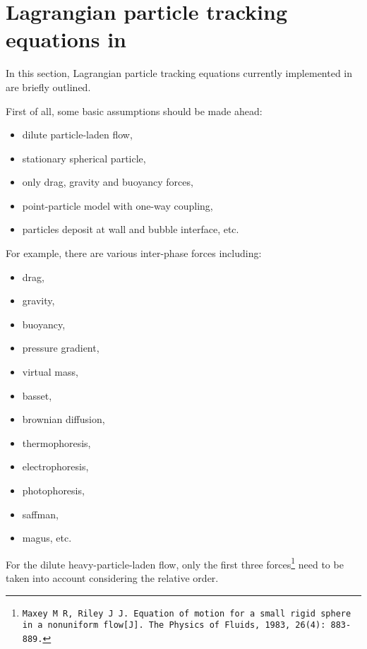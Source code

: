 \section{Lagrangian particle tracking equations in {\psiboil}}

\label{sec_lptequations}

In this section, Lagrangian particle tracking equations currently implemented in {\psiboil} are briefly outlined.

First of all, some basic assumptions should be made ahead:

\begin{itemize}
  \item {dilute particle-laden flow}, 
  \item {stationary spherical particle}, 
  \item {only drag, gravity and buoyancy forces}, 
  \item {point-particle model with one-way coupling},
  \item {particles deposit at wall and bubble interface, etc}.
\end{itemize}

For example, there are various inter-phase forces including:

\begin{itemize}
  \item {drag}, 
  \item {gravity}, 
  \item {buoyancy}, 
  \item {pressure gradient},
  \item {virtual mass},
  \item {basset},
  \item {brownian diffusion},
  \item {thermophoresis},
  \item {electrophoresis},
  \item {photophoresis},
  \item {saffman},
  \item {magus, etc}.
\end{itemize}

For the dilute heavy-particle-laden flow, only the first three forces\footnote{\tt Maxey M R, Riley J J. Equation of motion for a small rigid sphere in a nonuniform flow[J]. The Physics of Fluids, 1983, 26(4): 883-889.} need to be taken into account considering the relative order.

